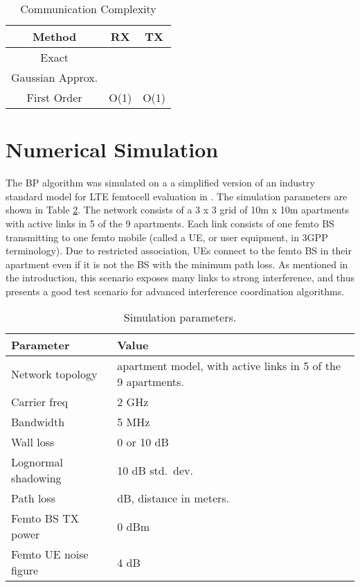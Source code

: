 \documentclass[letterpaper,twocolumn,twoside]{IEEEtran}
\begin{document}
\begin{table}
\begin{center}
\begin{tabular}{|c|c|c|}
 \hline Method & RX  & TX  \\
\hline Exact & & \\
\hline Gaussian Approx. & &  \\
\hline First Order & O(1) & O(1)\\
\hline
\end{tabular}
\end{center}
\caption{Communication Complexity}
\label{tab:comm_compl}
\end{table}

\section{Numerical Simulation} \label{sec:sim}

The BP algorithm was simulated on a
a simplified version of an industry standard
model for LTE femtocell evaluation in \cite{FemtoForum:10}.
The simulation parameters are shown in Table \ref{tbl:simParam}.
The network consists of a 3 x 3 grid of 10m x 10m apartments
with active links in 5 of the 9 apartments.
Each link consists of one femto BS transmitting to one femto mobile
(called a UE, or user equipment, in 3GPP terminology).
Due to restricted association, UEs connect to the femto BS in their
apartment even if it is not the BS with the minimum path loss.
As mentioned in the introduction, this scenario exposes many links
to strong interference, and thus presents a good test scenario for
advanced interference coordination algorithms.


\begin{table}
\begin{center}
\begin{tabular}{|p{1in}|p{2in}|}
\hline
Parameter & Value \\ \hline
Network topology &  apartment model, with active links in 5 of the 9 apartments.
\\ \hline
Carrier freq & 2 GHz \\ \hline
Bandwidth & 5 MHz \\ \hline
Wall loss & 0 or 10 dB \\ \hline
Lognormal shadowing & 10 dB std.\ dev.\ \\ \hline
Path loss &  dB,  distance in meters. \\ \hline
Femto BS TX power & 0 dBm \\ \hline
Femto UE noise figure & 4 dB \\ \hline
\end{tabular}
\end{center}
\caption{Simulation parameters.}
\label{tbl:simParam}
\end{table}
\end{document}
